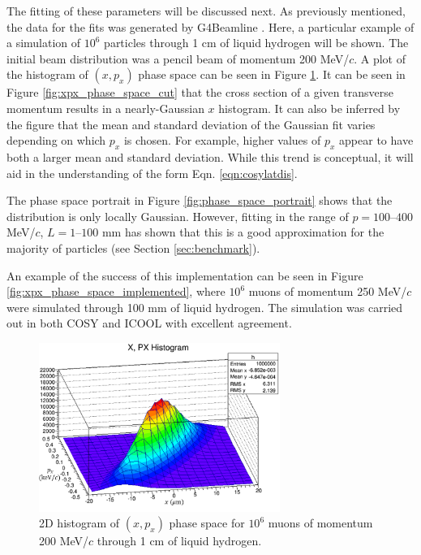 The fitting of these parameters will be discussed next. As previously mentioned, the data for the fits was generated by G4Beamline \cite{g4bl}. Here, a particular example of a simulation of $10^6$ particles through 1 cm of liquid hydrogen will be shown. The initial beam distribution was a pencil beam of momentum 200 MeV/$c$. A plot of the histogram of $(x,p_x)$ phase space can be seen in Figure \ref{fig:xpx_phase_space}. It can be seen in Figure \ref{fig:xpx_phase_space_cut} that the cross section of a given transverse momentum results in a nearly-Gaussian $x$ histogram. It can also be inferred by the figure that the mean and standard deviation of the Gaussian fit varies depending on which $p_x$ is chosen. For example, higher values of $p_x$ appear to have both a larger mean and standard deviation. While this trend is conceptual, it will aid in the understanding of the form Eqn. \ref{eqn:cosylatdis}.

The phase space portrait in Figure \ref{fig:phase_space_portrait} shows that the distribution is only locally Gaussian. However, fitting in the range of $p=100\text{--}400$ MeV/$c$, $L=1\text{--}100$ mm has shown that this is a good approximation for the majority of particles (see Section \ref{sec:benchmark}).

An example of the success of this implementation can be seen in Figure \ref{fig:xpx_phase_space_implemented}, where $10^6$ muons of momentum 250 MeV/$c$ were simulated through 100 mm of liquid hydrogen. The simulation was carried out in both COSY and ICOOL \cite{icool} with excellent agreement.

\begin{figure}[H]
  \centering
    \includegraphics[width=0.7\textwidth]{Figures/xpx_phase_space} 
  \caption[2D histogram of $(x,p_x)$ phase space.]{2D histogram of $(x,p_x)$ phase space for $10^6$ muons of momentum 200 MeV/$c$ through 1 cm of liquid hydrogen.}
  \label{fig:xpx_phase_space}
\end{figure}


